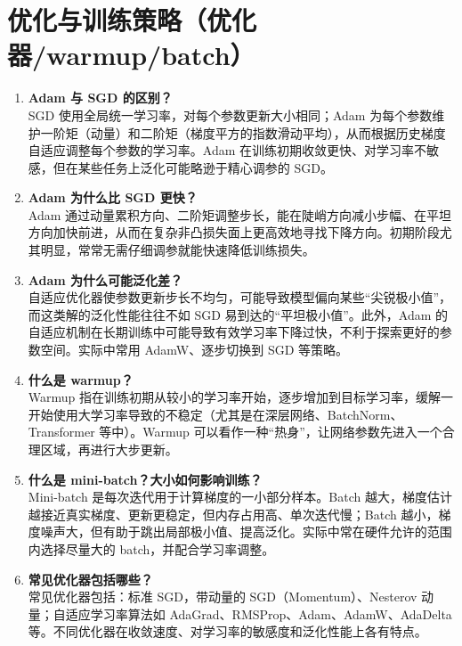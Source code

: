 \documentclass{article}
\begin{document}
\section{优化与训练策略（优化器/warmup/batch）}
\begin{enumerate}
\item \textbf{Adam 与 SGD 的区别？}\\
SGD 使用全局统一学习率，对每个参数更新大小相同；Adam 为每个参数维护一阶矩（动量）和二阶矩（梯度平方的指数滑动平均），从而根据历史梯度自适应调整每个参数的学习率。Adam 在训练初期收敛更快、对学习率不敏感，但在某些任务上泛化可能略逊于精心调参的 SGD。

\item \textbf{Adam 为什么比 SGD 更快？}\\
Adam 通过动量累积方向、二阶矩调整步长，能在陡峭方向减小步幅、在平坦方向加快前进，从而在复杂非凸损失面上更高效地寻找下降方向。初期阶段尤其明显，常常无需仔细调参就能快速降低训练损失。

\item \textbf{Adam 为什么可能泛化差？}\\
自适应优化器使参数更新步长不均匀，可能导致模型偏向某些“尖锐极小值”，而这类解的泛化性能往往不如 SGD 易到达的“平坦极小值”。此外，Adam 的自适应机制在长期训练中可能导致有效学习率下降过快，不利于探索更好的参数空间。实际中常用 AdamW、逐步切换到 SGD 等策略。

\item \textbf{什么是 warmup？}\\
Warmup 指在训练初期从较小的学习率开始，逐步增加到目标学习率，缓解一开始使用大学习率导致的不稳定（尤其是在深层网络、BatchNorm、Transformer 等中）。Warmup 可以看作一种“热身”，让网络参数先进入一个合理区域，再进行大步更新。

\item \textbf{什么是 mini-batch？大小如何影响训练？}\\
Mini-batch 是每次迭代用于计算梯度的一小部分样本。Batch 越大，梯度估计越接近真实梯度、更新更稳定，但内存占用高、单次迭代慢；Batch 越小，梯度噪声大，但有助于跳出局部极小值、提高泛化。实际中常在硬件允许的范围内选择尽量大的 batch，并配合学习率调整。

\item \textbf{常见优化器包括哪些？}\\
常见优化器包括：标准 SGD，带动量的 SGD（Momentum）、Nesterov 动量；自适应学习率算法如 AdaGrad、RMSProp、Adam、AdamW、AdaDelta 等。不同优化器在收敛速度、对学习率的敏感度和泛化性能上各有特点。
\end{enumerate}
\end{document}
